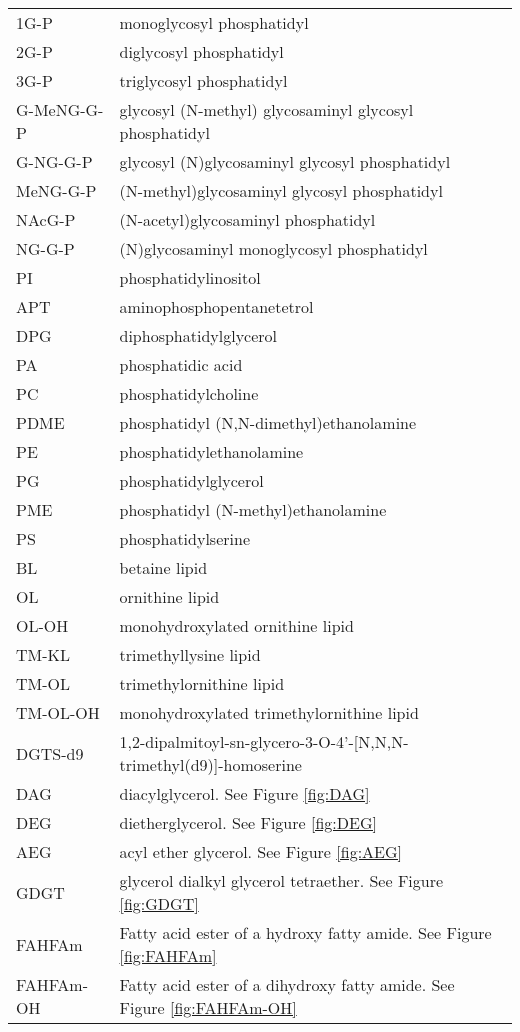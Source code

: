 \begin{tabular}{ l l }
1G-P & monoglycosyl phosphatidyl\\
2G-P & diglycosyl phosphatidyl\\
3G-P & triglycosyl phosphatidyl\\
G-MeNG-G-P & glycosyl (N-methyl) glycosaminyl glycosyl phosphatidyl\\
G-NG-G-P & glycosyl (N)glycosaminyl glycosyl phosphatidyl\\
MeNG-G-P & (N-methyl)glycosaminyl glycosyl phosphatidyl\\
NAcG-P & (N-acetyl)glycosaminyl phosphatidyl\\
NG-G-P & (N)glycosaminyl monoglycosyl phosphatidyl\\
PI & phosphatidylinositol\\

APT & aminophosphopentanetetrol\\
DPG & diphosphatidylglycerol\\
PA & phosphatidic acid\\
PC & phosphatidylcholine\\
PDME & phosphatidyl (N,N-dimethyl)ethanolamine\\
PE & phosphatidylethanolamine\\
PG & phosphatidylglycerol\\
PME & phosphatidyl (N-methyl)ethanolamine\\
PS & phosphatidylserine\\


BL & betaine lipid\\
OL & ornithine lipid\\
OL-OH & monohydroxylated ornithine lipid\\
TM-KL & trimethyllysine lipid\\
TM-OL & trimethylornithine lipid\\
TM-OL-OH & monohydroxylated trimethylornithine lipid\\

DGTS-d9 & 1,2-dipalmitoyl-sn-glycero-3-O-4'-[N,N,N-trimethyl(d9)]-homoserine\\

DAG & diacylglycerol. See Figure \ref{fig:DAG}\\
DEG & dietherglycerol. See Figure \ref{fig:DEG}\\
AEG & acyl ether glycerol. See Figure \ref{fig:AEG}\\
GDGT & glycerol dialkyl glycerol tetraether. See Figure \ref{fig:GDGT}\\
FAHFAm & Fatty acid ester of a hydroxy fatty amide. See Figure \ref{fig:FAHFAm}\\
FAHFAm-OH & Fatty acid ester of a dihydroxy fatty amide. See Figure \ref{fig:FAHFAm-OH}\\


\end{tabular}
